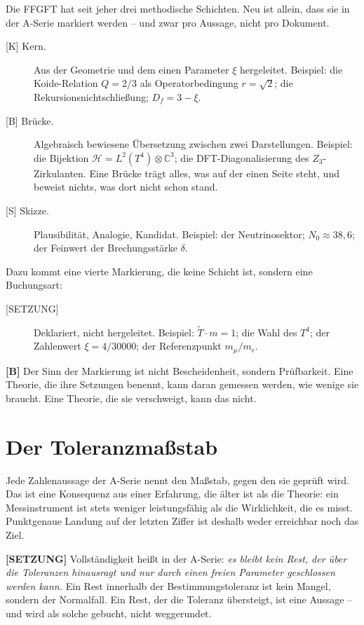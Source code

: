 Die FFGFT hat seit jeher drei methodische Schichten. Neu ist allein, dass sie
in der A-Serie markiert werden -- und zwar pro Aussage, nicht pro Dokument.

\begin{description}
  \item[{[K]} Kern.] Aus der Geometrie und dem einen Parameter $\xi$
    hergeleitet. Beispiel: die Koide-Relation $Q = 2/3$ als Operatorbedingung
    $r = \sqrt{2}$; die Rekursionsnichtschließung; $D_f = 3-\xi$.
  \item[{[B]} Brücke.] Algebraisch bewiesene Übersetzung zwischen zwei
    Darstellungen. Beispiel: die Bijektion $\mathcal{H} = L^2(T^4)\otimes
    \mathbb{C}^3$; die DFT-Diagonalisierung des $Z_3$-Zirkulanten. Eine Brücke
    trägt alles, was auf der einen Seite steht, und beweist nichts, was dort
    nicht schon stand.
  \item[{[S]} Skizze.] Plausibilität, Analogie, Kandidat. Beispiel: der
    Neutrinosektor; $N_0 \approx 38{,}6$; der Feinwert der Brechungsstärke $\delta$.
\end{description}

Dazu kommt eine vierte Markierung, die keine Schicht ist, sondern eine
Buchungsart:

\begin{description}
  \item[{[SETZUNG]}] Deklariert, nicht hergeleitet. Beispiel: $\tilde T\cdot m
    = 1$; die Wahl des $T^4$; der Zahlenwert $\xi = 4/30000$; der
    Referenzpunkt $m_\mu/m_e$.
\end{description}

\textbf{[B]} Der Sinn der Markierung ist nicht Bescheidenheit, sondern Prüfbarkeit. Eine
Theorie, die ihre Setzungen benennt, kann daran gemessen werden, wie wenige sie
braucht. Eine Theorie, die sie verschweigt, kann das nicht.

\section{Der Toleranzmaßstab}

Jede Zahlenaussage der A-Serie nennt den Maßstab, gegen den sie geprüft wird.
Das ist eine Konsequenz aus einer Erfahrung, die älter ist als die Theorie: ein
Messinstrument ist stets weniger leistungsfähig als die Wirklichkeit, die es
misst. Punktgenaue Landung auf der letzten Ziffer ist deshalb weder erreichbar
noch das Ziel.

\textbf{[SETZUNG]} Vollständigkeit heißt in der A-Serie: \emph{es bleibt kein Rest, der über die
Toleranzen hinausragt und nur durch einen freien Parameter geschlossen werden
kann.} Ein Rest innerhalb der Bestimmungstoleranz ist kein Mangel, sondern der
Normalfall. Ein Rest, der die Toleranz übersteigt, ist eine Aussage -- und wird
als solche gebucht, nicht weggerundet.

